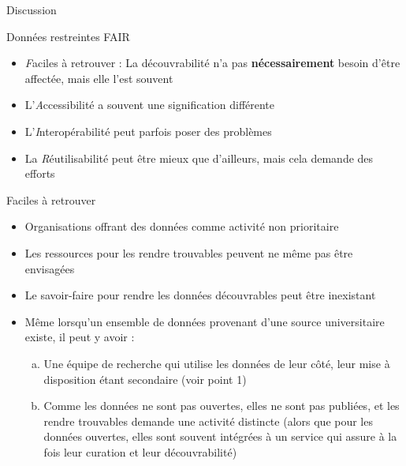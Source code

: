 \documentclass[
  ignorenonframetext,
]{beamer}
\providecommand{\tightlist}{%
  \setlength{\itemsep}{0pt}\setlength{\parskip}{0pt}}
\begin{document}
\begin{frame}{Discussion}
\label{discussion}
\end{frame}

\begin{frame}{Données restreintes FAIR}
\label{donnuxe9es-restreintes-fair}
\begin{itemize}
\tightlist
\item
  \emph{F}aciles à retrouver : La découvrabilité n'a pas
  \textbf{nécessairement} besoin d'être affectée, mais elle l'est
  souvent
\item
  L'\emph{A}ccessibilité a souvent une signification différente\\
\item
  L'\emph{I}nteropérabilité peut parfois poser des problèmes
\item
  La \emph{R}éutilisabilité peut être mieux que d'ailleurs, mais cela
  demande des efforts
\end{itemize}
\end{frame}

\begin{frame}{Faciles à retrouver}
\label{faciles-uxe0-retrouver}
\begin{itemize}
\item
  Organisations offrant des données comme activité non prioritaire
\item
  Les ressources pour les rendre trouvables peuvent ne même pas être
  envisagées
\item
  Le savoir-faire pour rendre les données découvrables peut être
  inexistant
\item
  Même lorsqu'un ensemble de données provenant d'une source
  universitaire existe, il peut y avoir :

  \begin{enumerate}
  [a.]
  \item
    Une équipe de recherche qui utilise les données de leur côté, leur
    mise à disposition étant secondaire (voir point 1)
  \item
    Comme les données ne sont pas ouvertes, elles ne sont pas publiées,
    et les rendre trouvables demande une activité distincte (alors que
    pour les données ouvertes, elles sont souvent intégrées à un service
    qui assure à la fois leur curation et leur découvrabilité)
  \end{enumerate}
\end{itemize}
\end{frame}
\end{document}
